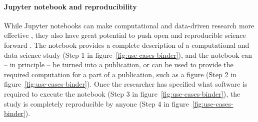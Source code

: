 % 
% 


\paragraph{Jupyter notebook and reproducibility}

While Jupyter notebooks can make computational and data-driven research more effective
\cite{Perkel2018,Fangohr2020,Granger2021}, they also have great potential to push
open and reproducible science forward \cite{Beg2021}. The notebook provides a complete
description of a computational and data science study (Step 1 in
figure~\ref{fig:use-cases-binder}), and the notebook can -- in principle -- be
turned into a publication, or can be used to provide the required computation
for a part of a publication, such as a figure (Step 2 in
figure~\ref{fig:use-cases-binder}). Once the researcher has specified what
software is required to execute the notebook (Step 3 in
figure~\ref{fig:use-cases-binder}), the study is completely reproducible by
anyone (Step 4 in figure~\ref{fig:use-cases-binder}).

